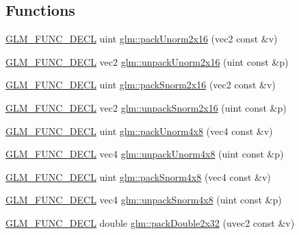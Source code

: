\subsection*{Functions}
\begin{DoxyCompactItemize}
\item 
\hyperlink{setup_8hpp_ab2d052de21a70539923e9bcbf6e83a51}{G\+L\+M\+\_\+\+F\+U\+N\+C\+\_\+\+D\+E\+CL} uint \hyperlink{group__core__func__packing_ga0659ddaf09727551c7bf51655d2a65cf}{glm\+::pack\+Unorm2x16} (vec2 const \&v)
\item 
\hyperlink{setup_8hpp_ab2d052de21a70539923e9bcbf6e83a51}{G\+L\+M\+\_\+\+F\+U\+N\+C\+\_\+\+D\+E\+CL} vec2 \hyperlink{group__core__func__packing_gaff327a2fca8abfe31b74b914b68ac5ec}{glm\+::unpack\+Unorm2x16} (uint const \&p)
\item 
\hyperlink{setup_8hpp_ab2d052de21a70539923e9bcbf6e83a51}{G\+L\+M\+\_\+\+F\+U\+N\+C\+\_\+\+D\+E\+CL} uint \hyperlink{group__core__func__packing_ga0c8005de240d6c4ca3d16c7bee25c622}{glm\+::pack\+Snorm2x16} (vec2 const \&v)
\item 
\hyperlink{setup_8hpp_ab2d052de21a70539923e9bcbf6e83a51}{G\+L\+M\+\_\+\+F\+U\+N\+C\+\_\+\+D\+E\+CL} vec2 \hyperlink{group__core__func__packing_gaa3f9bd6a71d7bdfab090b9626f2466aa}{glm\+::unpack\+Snorm2x16} (uint const \&p)
\item 
\hyperlink{setup_8hpp_ab2d052de21a70539923e9bcbf6e83a51}{G\+L\+M\+\_\+\+F\+U\+N\+C\+\_\+\+D\+E\+CL} uint \hyperlink{group__core__func__packing_ga834ee9a9e73dcb0a7c1fc88143f3edb8}{glm\+::pack\+Unorm4x8} (vec4 const \&v)
\item 
\hyperlink{setup_8hpp_ab2d052de21a70539923e9bcbf6e83a51}{G\+L\+M\+\_\+\+F\+U\+N\+C\+\_\+\+D\+E\+CL} vec4 \hyperlink{group__core__func__packing_ga5d3c4d354b48a317935349dd62a8b8a5}{glm\+::unpack\+Unorm4x8} (uint const \&p)
\item 
\hyperlink{setup_8hpp_ab2d052de21a70539923e9bcbf6e83a51}{G\+L\+M\+\_\+\+F\+U\+N\+C\+\_\+\+D\+E\+CL} uint \hyperlink{group__core__func__packing_gafcf25acc0d361c6c696a433aa5dfd16b}{glm\+::pack\+Snorm4x8} (vec4 const \&v)
\item 
\hyperlink{setup_8hpp_ab2d052de21a70539923e9bcbf6e83a51}{G\+L\+M\+\_\+\+F\+U\+N\+C\+\_\+\+D\+E\+CL} vec4 \hyperlink{group__core__func__packing_ga126a0deffef1f2d10dd67237981a870b}{glm\+::unpack\+Snorm4x8} (uint const \&p)
\item 
\hyperlink{setup_8hpp_ab2d052de21a70539923e9bcbf6e83a51}{G\+L\+M\+\_\+\+F\+U\+N\+C\+\_\+\+D\+E\+CL} double \hyperlink{group__core__func__packing_gaf728fdfb98ce34da6f968d9f6bf154d7}{glm\+::pack\+Double2x32} (uvec2 const \&v)

\end{DoxyCompactItemize}
